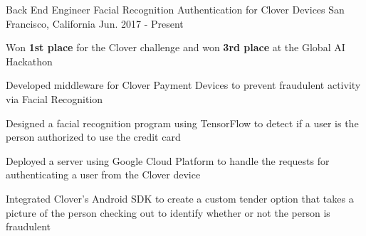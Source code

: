 \begin{cventries}
\cventry
{Back End Engineer} %
{Facial Recognition Authentication for Clover Devices} %
{San Francisco, California} %
{Jun. 2017 - Present} %
{ %
\begin{cvitems}
\item {Won \textbf{1st place} for the Clover challenge and won \textbf{3rd place} at the Global AI Hackathon}
\item {Developed middleware for Clover Payment Devices to prevent fraudulent activity via Facial Recognition}
\item {Designed a facial recognition program using TensorFlow to detect if a user is the person authorized to use the credit card}
\item {Deployed a server using Google Cloud Platform to handle the requests for authenticating a user from the Clover device}
\item {Integrated Clover's Android SDK to create a custom tender option that takes a picture of the person checking out to identify whether or not the person is fraudulent}
\end{cvitems}
}

\begin{comment}
\cventry
{Team Lead} %
{Machine Learning API} %
{San Francisco, California} %
{Jun. 2017 - Present} %
{ %
\begin{cvitems}
\item {Designed an API for commonly used machine learning models to support Hackathon team's artificial intelligence applications}
\item {Deployed an API via Google Cloud to interface Clover payment devices and Chui's API}
\end{cvitems}
}
\end{comment}

\begin{comment}
\cventry
{Solo} %
{Text File Compression} %
{San Luis Obispo, California} %
{Oct. 2016 - Nov. 2016} %
{ %
\begin{cvitems}
\item {Implemented Huffman Coding to compress text files in Java and C}
\item {Designed complimentary encoding program to compress files into characters to serve an educational purpose for those learning how compression works}
\end{cvitems}
}
\end{comment}


\end{cventries}
